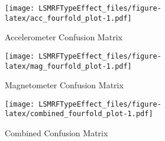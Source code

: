\documentclass[]{article}
\begin{document}
\newpage

\begin{figure}
\centering
\texttt{[image: LSMRFTypeEffect\_files/figure-latex/acc\_fourfold\_plot-1.pdf]}
\caption{Accelerometer Confusion Matrix}
\end{figure}

\begin{figure}
\centering
\texttt{[image: LSMRFTypeEffect\_files/figure-latex/mag\_fourfold\_plot-1.pdf]}
\caption{Magnetometer Confusion Matrix}
\end{figure}

\begin{figure}
\centering
\texttt{[image: LSMRFTypeEffect\_files/figure-latex/combined\_fourfold\_plot-1.pdf]}
\caption{Combined Confusion Matrix}
\end{figure}
\end{document}

